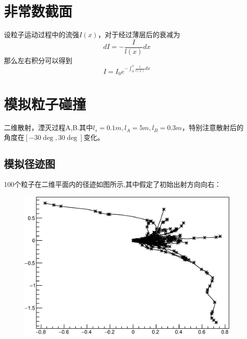 \documentclass[UTF8]{ctexart}
\begin{document}
\section{非常数截面}
设粒子运动过程中的流强$I(x)$，对于经过薄层后的衰减为
\[dI=-\frac{I}{l(x)}dx\]
那么左右积分可以得到
\[I=I_0e^{-\int_0^x{\frac{1}{l(x)}dx}}\]
\section{模拟粒子碰撞}
二维散射，湮灭过程A,B.其中$l_s=0.1m,l_A=5m,l_B=0.3m$，特别注意散射后的角度在$[-30\deg,30\deg]$变化。
\subsection{模拟径迹图}
100个粒子在二维平面内的径迹如图所示,其中假定了初始出射方向向右：
\begin{figure}[h]
\includegraphics[width=.8\textwidth]{track100.eps}
\end{figure}
\end{document}
